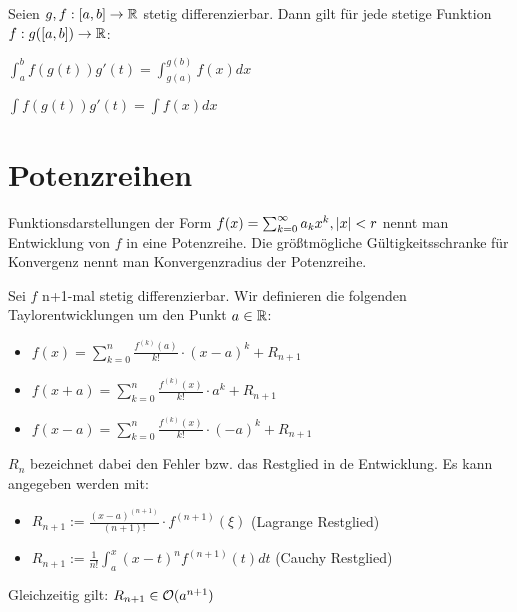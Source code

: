 \begin{satz}
	Seien $g,f : [a,b] \rightarrow \mathbb{R}$ stetig differenzierbar. Dann gilt für jede stetige Funktion $f : g([a,b]) \rightarrow \mathbb{R}$:
	\begin{description}[noitemsep]
		\item $\int_{a}^{b} f(g(t))g'(t) = \int_{g(a)}^{g(b)}f(x)dx$
		\item $\int f(g(t))g'(t) = \int f(x)dx$
	\end{description}
\end{satz}


\section{Potenzreihen}

\begin{definition}
	Funktionsdarstellungen der Form $f(x) = \sum_{k = 0}^{\infty} a_{k}x^k, |x| < r$ nennt man Entwicklung von $f$ in eine Potenzreihe. Die größtmögliche Gültigkeitsschranke für Konvergenz nennt man Konvergenzradius der Potenzreihe.
\end{definition}

\begin{satz}	
	Sei $f $ n+1-mal stetig differenzierbar. Wir definieren die folgenden Taylorentwicklungen um den Punkt $a \in \mathbb{R}$:
	
	\begin{itemize}[noitemsep]
		\item $f(x) =  \sum_{k = 0}^n \frac{f^{(k)}(a)}{k!} \cdot (x - a)^k + R_{n+1}$
		\item $f(x + a) = \sum_{k = 0}^n \frac{f^{(k)}(x)}{k!} \cdot a^k + R_{n+1}$
		\item $f(x - a) = \sum_{k = 0}^n \frac{f^{(k)}(x)}{k!} \cdot (-a)^k + R_{n+1}$
	\end{itemize}

	$R_n$ bezeichnet dabei den Fehler bzw. das Restglied in de Entwicklung. Es kann angegeben werden mit:
	
	\begin{itemize}[noitemsep]
		\item $R_{n+1} := \frac{(x - a)^{(n + 1)}}{(n + 1)!} \cdot f^{(n + 1)}(\xi)$ (Lagrange Restglied)
		\item $R_{n+1} := \frac{1}{n!} \int_{a}^{x} (x - t)^nf^{(n+1)}(t)dt$ (Cauchy Restglied)
	\end{itemize}

	Gleichzeitig gilt: $R_{n+1} \in \mathcal{O}(a^{n+1})$

\end{satz}

